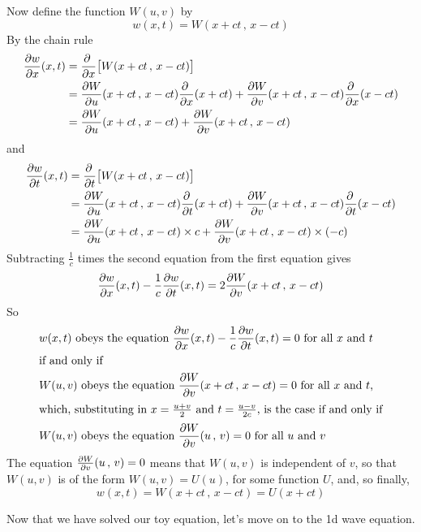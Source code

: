Now define the function $W(u,v)$ by
\begin{equation*}
w(x,t) = W(x+ct\,,\,x-ct)
\end{equation*} 
By the chain rule
\begin{align*}
\pdiff{w}{x}(x,t)
&=\pdiff{}{x}\big[W(x+ct\,,\,x-ct) \big] \\
&= \pdiff{W}{u}(x+ct\,,\,x-ct)\pdiff{}{x}(x+ct) 
  + \pdiff{W}{v}(x+ct\,,\,x-ct) \pdiff{}{x}(x-ct)  \\
&= \pdiff{W}{u}(x+ct\,,\,x-ct) + \pdiff{W}{v}(x+ct\,,\,x-ct)  
\end{align*}
and
\begin{align*}
\pdiff{w}{t}(x,t)
&=\pdiff{}{t}\big[W(x+ct\,,\,x-ct) \big] \\
&= \pdiff{W}{u}(x+ct\,,\,x-ct)\pdiff{}{t}(x+ct) 
  + \pdiff{W}{v}(x+ct\,,\,x-ct) \pdiff{}{t}(x-ct)  \\
&= \pdiff{W}{u}(x+ct\,,\,x-ct)\times c 
             + \pdiff{W}{v}(x+ct\,,\,x-ct)\times(-c)  
\end{align*}
Subtracting $\frac{1}{c}$ times the second equation from
the first equation gives 
\begin{equation*}
\pdiff{w}{x}(x,t)-\frac{1}{c}\pdiff{w}{t}(x,t)
= 2 \pdiff{W}{v}(x+ct\,,\,x-ct)
\end{equation*}
So 
\begin{align*}
&\text{$w(x,t)$ obeys the equation 
$\pdiff{w}{x}(x,t)-\frac{1}{c}\pdiff{w}{t}(x,t)=0$ for all $x$ and $t$}\\
\intertext{if and only if }
&\text{$W(u,v)$ obeys the equation  $\pdiff{W}{v}(x+ct\,,\,x-ct)=0$
for all $x$ and $t$,}\\
\intertext{which, substituting in $x=\frac{u+v}{2}$ and $t=\frac{u-v}{2c}$,  
                  is the case if and only if} 
&\text{$W(u,v)$ obeys the equation  $\pdiff{W}{v}(u\,,\,v)=0$
for all $u$ and $v$}
\end{align*}
The equation $\pdiff{W}{v}(u\,,\,v)=0$ means that $W(u,v)$ is independent of
$v$, so that $W(u,v)$ is of the form $W(u,v)=U(u)$, for some function $U$,
and, so finally,
\begin{equation*}
w(x,t) = W(x+ct\,,\,x-ct) = U(x+ct)
\end{equation*}

Now that we have solved our toy equation, let's move on to the 1d
wave equation.

